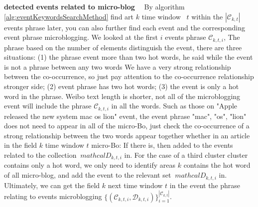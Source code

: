 \documentclass{sig-alternate-05-2015}
\begin{document}
\textbf{detected events related to micro-blog}
\ \
By algorithm \ref{alg:eventKeywordsSearchMethod} find art \(k \) time window \ \(t \) within the \(| \mathcal{C}_{k, t} | \) events phrase later, you can also further find each event and the corresponding event phrase microblogging.
We looked at the first \(i \) events phrase \(\mathcal{C}_{k, t, i} \),
The phrase based on the number of elements distinguish the event, there are three situations: (1) the phrase event more than two hot words, he said while the event is not a phrase between any two words We have a very strong relationship between the co-occurrence, so just pay attention to the co-occurrence relationship stronger side; (2) event phrase has two hot words; (3) the event is only a hot word in the phrase.
Weibo text length is shorter, not all of the microblogging event will include the phrase \(\mathcal{C}_{k, t, i} \) in all the words.
Such as those on "Apple released the new system mac os lion" event, the event phrase "mac", "os", "lion" does not need to appear in all of the micro-Bo, just check the co-occurrence of a strong relationship between the two words appear together whether in an article in the field \(k \) time window \(t \) micro-Bo: If there is, then added to the events related to the collection \(\ mathcal {D} _ {k, t, i} \) in.
For the case of a third cluster cluster contains only a hot word, we only need to identify areas \(k \) contains the hot word of all micro-blog, and add the event to the relevant set \(\ mathcal{D }_{k, t, i} \) in.
Ultimately, we can get the field \(k \) next time window \(t \) in the event the phrase relating to events microblogging \(\{(\mathcal{C}_{k, t, i}, \mathcal{D}_{k, t, i}) \}_{i=1}^{| \mathcal{C}_{k, t} |} \).
\end{document}
